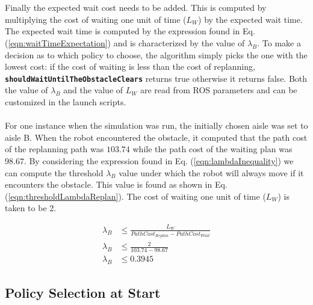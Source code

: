 \documentclass[a4paper,12pt]{article}
\begin{document}
			\\
			\\
			Finally the expected wait cost needs to be added. This is computed by multiplying the cost of waiting one unit of time ($L_W$) by the expected wait time. The expected wait time is computed by the expression found in Eq. (\ref{eqn:waitTimeExpectation}) and is characterized by the value of $\lambda_B$. To make a decision as to which policy to choose, the algorithm simply picks the one with the lowest cost: if the cost of waiting is less than the cost of replanning, \textbf{\texttt{shouldWaitUntilTheObstacleClears}} returns true otherwise it returns false. Both the value of $\lambda_B$ and the value of $L_W$ are read from ROS parameters and can be customized in the launch scripts.
			\\
			\\
			For one instance when the simulation was run, the initially chosen aisle was set to aisle B. When the robot encountered the obstacle, it computed that the path cost of the replanning path was $103.74$ while the path cost of the waiting plan was $98.67$. By considering the expression found in Eq. (\ref{eqn:lambdaInequality}) we can compute the threshold $\lambda_B$ value under which the robot will always move if it encounters the obstacle. This value is found as shown in Eq. (\ref{eqn:thresholdLambdaReplan}). The cost of waiting one unit of time ($L_W$) is taken to be 2.
			
			\begin{equation}
			\begin{split}
				\lambda_B &\leq \frac{L_W}{PathCost_{Replan} - PathCost_{Wait}} \\
				\lambda_B &\leq \frac{2}{103.74 - 98.67} \\
				\lambda_B &\leq 0.3945
			\end{split}
			\label{eqn:thresholdLambdaReplan}
			\end{equation}
			
		\subsection{Policy Selection at Start}
		\label{sec:policySelectionAtStartROS}
		
\end{document}
